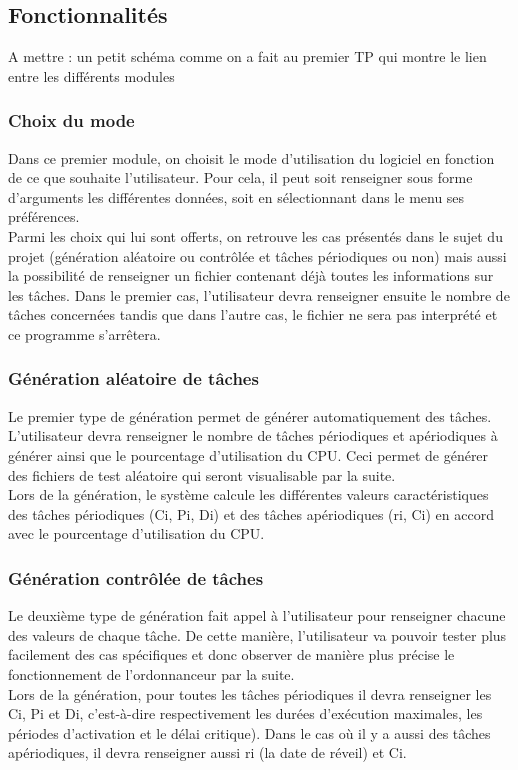 		\subsection{Fonctionnalités}

			\Huge
			A mettre : un petit schéma comme on a fait au premier TP qui montre le lien entre les différents modules
			\normalsize
		    
			\subsubsection{Choix du mode}
				Dans ce premier module, on choisit le mode d’utilisation du logiciel en fonction de ce que souhaite l’utilisateur. Pour cela, il peut soit renseigner sous forme d’arguments les différentes données, soit en sélectionnant dans le menu ses préférences. \\

				Parmi les choix qui lui sont offerts, on retrouve les cas présentés dans le sujet du projet (génération aléatoire ou contrôlée et tâches périodiques ou non) mais aussi la possibilité de renseigner un fichier contenant déjà toutes les informations sur les tâches. Dans le premier cas, l’utilisateur devra renseigner ensuite le nombre de tâches concernées tandis que dans l’autre cas, le fichier ne sera pas interprété et ce programme s’arrêtera.


			\subsubsection{Génération aléatoire de tâches}
				Le premier type de génération permet de générer automatiquement des tâches. L'utilisateur devra renseigner le nombre de tâches périodiques et apériodiques à générer ainsi que le pourcentage d'utilisation du CPU. Ceci permet de générer des fichiers de test aléatoire qui seront visualisable par la suite.\\
				Lors de la génération, le système calcule les différentes valeurs caractéristiques des tâches périodiques (Ci, Pi, Di) et des tâches apériodiques (ri, Ci) en accord avec le pourcentage d'utilisation du CPU. 

			\subsubsection{Génération contrôlée de tâches}
				Le deuxième type de génération fait appel à l'utilisateur pour renseigner chacune des valeurs de chaque tâche. De cette manière, l'utilisateur va pouvoir tester plus facilement des cas spécifiques et donc observer de manière plus précise le fonctionnement de l'ordonnanceur par la suite. \\
				Lors de la génération, pour toutes les tâches périodiques il devra renseigner les Ci, Pi et Di, c'est-à-dire respectivement les durées d'exécution maximales, les périodes d'activation et le délai critique). Dans le cas où il y a aussi des tâches apériodiques, il devra renseigner aussi ri (la date de réveil) et Ci.

